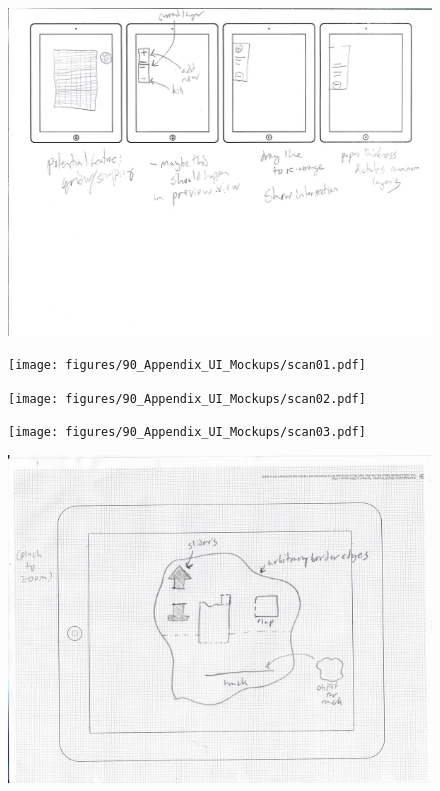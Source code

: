 \begin{figure}[htbp]
\centering
\includegraphics{figures/90_Appendix_UI_Mockups/011.png}
\caption{}
\end{figure}

\begin{figure}[htbp]
\centering
\texttt{[image: figures/90\_Appendix\_UI\_Mockups/scan01.pdf]}
\caption{}
\end{figure}

\begin{figure}[htbp]
\centering
\texttt{[image: figures/90\_Appendix\_UI\_Mockups/scan02.pdf]}
\caption{}
\end{figure}

\begin{figure}[htbp]
\centering
\texttt{[image: figures/90\_Appendix\_UI\_Mockups/scan03.pdf]}
\caption{}
\end{figure}

\begin{figure}[htbp]
\centering
\includegraphics{figures/90_Appendix_UI_Mockups/scan04.pdf}
\caption{}
\end{figure}

\clearpage
